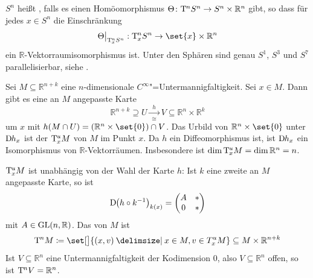 \begin{bemerkung}[{name=[Parallelisierbarkeit von Sphären]}]
	$S^n$ heißt , falls es einen Homöomorphismus  $\Theta \colon \mathrm{T}\mkern-0.85mu^n S^n \to S^n\times \mathbb{R}^n$ gibt, so dass für jedes $x \in S^n$ die Einschränkung 
	\[
		\Theta\big|_{\Tang_x^n S^n} : \Tang^n_x S^n \to \set{x}\times \mathbb{R}^n 
	\]
	ein $\mathbb{R}$-Vektorraumisomorphismus ist. 
	Unter den Sphären sind genau $S^1$, $S^3$ und $S^7$
	parallelisierbar, siehe  \textcite{bott1958parallelizability}.
\end{bemerkung}

\begin{beispiel}[{name=[Tangentialraum einer Untermannigfaltigkeit]}]
	Sei $M \subseteq \mathbb{R}^{n+k}$ eine $n$-dimensionale $C^\infty$"=Untermannigfaltigkeit. 
	Sei $x \in M$. 
	Dann gibt es eine an $M$ angepasste Karte 
	\[
		\mathbb{R}^{n+k} \supseteq U \xrightarrow[\cong]{\enspace h \enspace} V \subseteq \mathbb{R}^n \times \mathbb{R}^k 
	\]
	um $x$ mit $h(M \cap U) =(\mathbb{R}^n \times \set{0})\cap V$.
	Das Urbild von $\mathbb{R}^n \times \set{0}$ unter $\mathrm{D}\mkern-1.0mu h_x$ ist der  $\mathrm{T}\mkern-0.85mu^u_x M$ von $M$ im Punkt $x$. 
	Da $h$ ein Diffeomorphismus ist, ist $\mathrm{D}\mkern-1.0mu h_x$ ein Isomorphismus von $\mathbb{R}$-Vektorräumen. 
	Insbesondere ist $\dim \mathrm{T}\mkern-0.85mu^u_x M = \dim \mathbb{R}^n = n$.
	
	$\mathrm{T}\mkern-0.85mu_x^u M$ ist unabhängig von der Wahl der Karte $h$: Ist $k$ eine zweite an $M$ angepasste Karte, so ist 
	\[
		\D \enbrace*{h \circ k ^{-1}}_{k(x)} = \begin{pmatrix}
			A & * \\
			0 & *
		\end{pmatrix}
	\]
	mit $A \in \operatorname{GL}(n,\mathbb{R})$. Das  von $M$ ist 
	\[
		\Tang^n M \coloneqq \set[\big]{(x,v) \given x \in M, v \in T_x^u M} \subseteq M \times \mathbb{R}^{n+k} 
	\]
	Ist $V \subseteq \mathbb{R}^n$ eine Untermannigfaltigkeit der Kodimension $0$, also $V \subseteq \mathbb{R}^n$ offen, so ist $\mathrm{T}\mkern-0.85mu^n V = \mathbb{R}^n$.
\end{beispiel}

